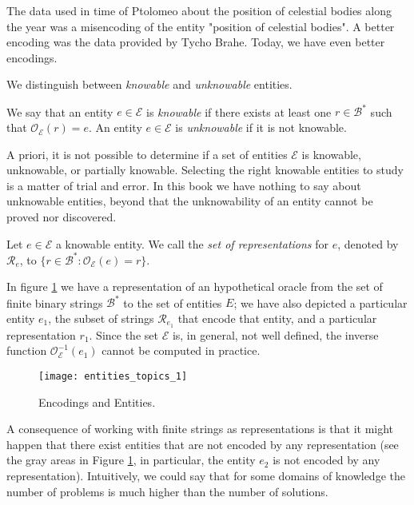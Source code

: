 \begin{example}
The data used in time of Ptolomeo about the position of celestial bodies along the year was a misencoding of the entity "position of celestial bodies". A better encoding was the data provided by Tycho Brahe. Today, we have even better encodings.
\end{example}

We distinguish between \emph{knowable} and \emph{unknowable} entities.

\begin{definition}
We say that an entity $e \in \mathcal{E}$ is \emph{knowable} if there exists at least one $r \in \mathcal{B}^\ast$ such that $\mathcal{O}_\mathcal{E}(r) = e$. An entity $e \in \mathcal{E}$ is \emph{unknowable} if it is not knowable.
\end{definition}

A priori, it is not possible to determine if a set of entities $\mathcal{E}$ is knowable, unknowable, or partially knowable. Selecting the right knowable entities to study is a matter of trial and error. In this book we have nothing to say about unknowable entities, beyond that the unknowability of an entity cannot be proved nor discovered.

\begin{definition}
Let $e \in \mathcal{E}$ a knowable entity. We call the \emph{set of representations} for $e$, denoted by $\mathcal{R}_e$, to $\{ r \in \mathcal{B}^\ast : \mathcal{O}_\mathcal{E} (e) = r \}$.
\end{definition}

In figure \ref{fig:entities_topics_1} we have a representation of an hypothetical oracle from the set of finite binary strings $\mathcal{B}^\ast$ to the set of entities $E$; we have also depicted a particular entity $e_1$, the subset of strings $\mathcal{R}_{e_1}$ that encode that entity, and a particular representation $r_1$. Since the set $\mathcal{E}$ is, in general, not well defined, the inverse function $\mathcal{O}_\mathcal{E}^{-1}(e_1)$ cannot be computed in practice.

\begin{figure}[h]
\centering\texttt{[image: entities\_topics\_1]}
\caption{\label{fig:entities_topics_1}Encodings and Entities.}
\end{figure}

A consequence of working with finite strings as representations is that it might happen that there exist entities that are not encoded by any representation (see the gray areas in Figure \ref{fig:entities_topics_1}, in particular, the entity $e_2$ is not encoded by any representation). Intuitively, we could say that for some domains of knowledge the number of problems is much higher than the number of solutions.

